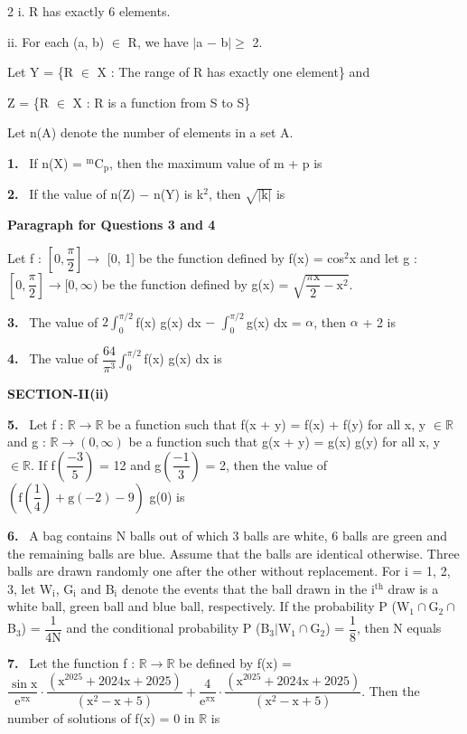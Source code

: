 \documentclass[10pt]{extarticle}
\newcommand{\sect}[1]{\par\smallskip\noindent\textbf{#1}\par}
\newcommand{\qn}[1]{\par\smallskip\noindent\textbf{#1.}~}
\newcommand{\paraq}[2]{\par\smallskip\noindent\textbf{Paragraph for Questions #1 and #2}\par}
\begin{document}
\begin{multicols}{2}
i. \quad R has exactly 6 elements.\par
ii. \quad For each (a, b) $\in$ R, we have $|$a $-$ b$|\geq$ 2.\par
Let Y = \{R $\in$ X : The range of R has exactly one element\} and\par
Z = \{R $\in$ X : R is a function from S to S\}\par
Let n(A) denote the number of elements in a set A.
\qn{1} If n(X) = $^{\mathrm m}$C$_\mathrm p$, then the maximum value of m + p is \underline{\hspace{1.5cm}}
\qn{2} If the value of n(Z) $-$ n(Y) is k$^2$, then $\sqrt{|\mathrm k|}$ is \underline{\hspace{1.5cm}}
\paraq{3}{4}
Let f : $\left[0,\dfrac\pi2\right]\to$ [0, 1] be the function defined by f(x) = cos$^2$x and let g : $\left[0,\dfrac\pi2\right]\to[0,\infty)$ be the function defined by g(x) = $\sqrt{\dfrac{\pi\mathrm x}2-\mathrm x^2}$.
\qn{3} The value of $2\displaystyle\int_0^{\pi/2}$f(x) g(x) dx $-$ $\displaystyle\int_0^{\pi/2}$g(x) dx = $\alpha$, then $\alpha$ + 2 is \underline{\hspace{1.5cm}}
\qn{4} The value of $\dfrac{64}{\pi^3}\displaystyle\int_0^{\pi/2}$f(x) g(x) dx is \underline{\hspace{1.5cm}}
\sect{SECTION-II(ii)}
\qn{5} Let f : $\mathbb R\to\mathbb R$ be a function such that f(x + y) = f(x) + f(y) for all x, y $\in\mathbb R$ and g : $\mathbb R\to(0,\infty)$ be a function such that g(x + y) = g(x) g(y) for all x, y $\in\mathbb R$. If f$\left(\dfrac{-3}5\right)$ = 12 and g$\left(\dfrac{-1}3\right)$ = 2, then the value of $\left(\mathrm f\left(\dfrac14\right)+\mathrm g(-2)-9\right)$ g(0) is \underline{\hspace{1.5cm}}
\qn{6} A bag contains N balls out of which 3 balls are white, 6 balls are green and the remaining balls are blue. Assume that the balls are identical otherwise. Three balls are drawn randomly one after the other without replacement. For i = 1, 2, 3, let W$_\mathrm i$, G$_\mathrm i$ and B$_\mathrm i$ denote the events that the ball drawn in the i$^{\mathrm{th}}$ draw is a white ball, green ball and blue ball, respectively. If the probability P (W$_1\cap$G$_2\cap$B$_3$) = $\dfrac1{4\mathrm N}$ and the conditional probability P (B$_3|$W$_1\cap$G$_2$) = $\dfrac18$, then N equals \underline{\hspace{1.5cm}}
\qn{7} Let the function f : $\mathbb R\to\mathbb R$ be defined by f(x) = $\dfrac{\sin\mathrm x}{\mathrm e^{\pi\mathrm x}}\cdot\dfrac{\left(\mathrm x^{2025}+2024\mathrm x+2025\right)}{\left(\mathrm x^2-\mathrm x+5\right)}+\dfrac4{\mathrm e^{\pi\mathrm x}}\cdot\dfrac{\left(\mathrm x^{2025}+2024\mathrm x+2025\right)}{\left(\mathrm x^2-\mathrm x+5\right)}$. Then the number of solutions of f(x) = 0 in $\mathbb R$ is \underline{\hspace{1.5cm}}

\end{multicols}
\end{document}
